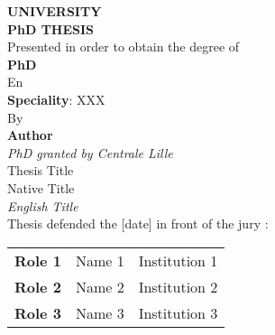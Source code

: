 \documentclass[11pt,fleqn,openany]{book} %
\begin{document}

\dominitoc
\doparttoc


\begin{titlepage}
    \begin{center}
        {\Huge\textbf{UNIVERSITY}} \\
        \vspace{0.5cm}
        \Large\textbf{PhD THESIS} \\
        \vspace{0.5cm}
        \large{Presented in order to obtain the degree of} \\
        \vspace{0.5cm}
        \Huge\textbf{PhD} \\
        \vspace{0.5cm}
        \Large{En} \\
        \vspace{0.5cm}
        \large{\textbf{Speciality}: XXX} \\
        \vspace{0.5cm}
        \Large{By} \\
        \vspace{0.5cm}
        \Huge\textbf{Author} \\
        \vspace{0.5cm}
        \large{\textit{PhD granted by Centrale Lille}} \\
        \vspace{0.5cm}
        \large{Thesis Title} \\
        \vspace{0.1cm}
        \Large{Native Title} \\
        \vspace{0.1cm}
        \Large{\textit{English Title}} \\
        \vspace{0.4cm}
        \large{Thesis defended the [date] in front of the jury :} \\
        \vspace{0.5cm}
        \hspace*{0.2cm}
        \begin{tabular}{lll}
            \large{\textbf{Role 1}} & \large{Name 1} & Institution 1\\
            \large{\textbf{Role 2}} & \large{Name 2} & Institution 2\\
            \large{\textbf{Role 3}} & \large{Name 3} & Institution 3\\

\end{tabular}
\end{center}
\end{titlepage}
\end{document}
